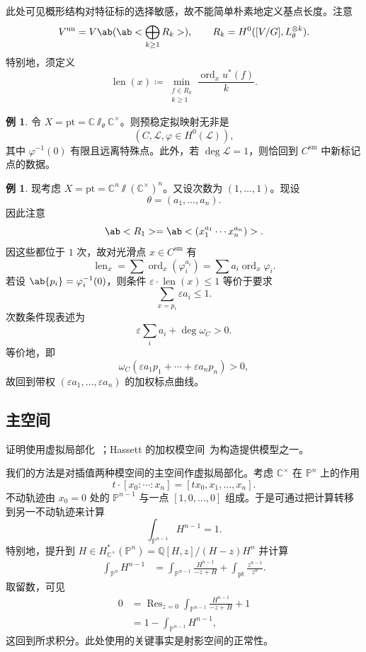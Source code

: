 \documentclass{amsart}
\theoremstyle{definition}
\newtheorem{exm}[thm]{例}
\theoremstyle{remark}
\theoremstyle{plain}
\theoremstyle{definition}
\theoremstyle{remark}
\newcommand{\C}{\mathbb{C}}
\newcommand{\Q}{\mathbb{Q}}
\renewcommand{\P}{\mathbb{P}}
\newcommand{\ep}{\varepsilon}
\newcommand{\mc}[1]{\mathcal{#1}}
\newcommand{\mr}[1]{\mathrm{#1}}
\newcommand{\on}[1]{\operatorname{#1}}
\newcommand{\1}{\mathbf{1}}
\newcommand{\2}{\mathbf{2}}
\newcommand{\3}{\mathbf{3}}
\begin{document}
此处可见概形结构对特征标的选择敏感，故不能简单朴素地定义基点长度。注意
\[ V^{\on{un}} = V\ab(\ab< \bigoplus_{k \geq 1} R_k>), \qquad R_k = H^0([V/G], L_{\theta}^{\otimes k}). \]
特别地，须定义
\[ \on{len}(x) \coloneqq \min_{\substack{f \in R_k \\ k \geq 1}} \frac{\on{ord}_x u^*(f)}{k}. \]

\begin{exm}
    令 \(X = \mr{pt} = \C \sslash_{\theta} \C^{\times}\)。则预稳定拟映射无非是
    \[ (C, \mc{L}, \varphi \in H^0(\mc{L})), \]
    其中 \(\varphi^{-1}(0)\) 有限且远离特殊点。此外，若 \(\deg \mc{L} = 1\)，则恰回到 \(C^{\mr{sm}}\) 中新标记点的数据。
\end{exm}

\begin{exm}
    现考虑 \(X = \mr{pt} = \C^n \sslash (\C^{\times})^n\)。又设次数为 \((1, \ldots, 1)\)。现设
    \[ \theta = (a_1, \ldots, a_n). \]
    因此注意
    \[ \ab<R_1> = \ab<(x_1^{a_1} \cdots x_n^{a_n})>. \]
    因这些都位于 \(1\) 次，故对光滑点 \(x \in C^{\mr{sm}}\) 有
    \[ \on{len}_x = \sum \on{ord}_x (\varphi_i^{a_i}) = \sum a_i \on{ord}_x \varphi_i. \]
    若设 \(\ab\{p_i\} = \varphi_i^{-1}(0)\)，则条件 \(\ep \cdot \on{len}(x) \leq 1\) 等价于要求
    \[ \sum_{x = p_i} \ep a_i \leq 1. \]
    次数条件现表述为
    \[ \ep \sum_i a_i + \deg \omega_C > 0. \]
    等价地，即
    \[ \omega_C(\ep a_1 p_1 + \cdots + \ep a_n p_n) > 0, \]
    故回到带权 \((\ep a_1, \ldots, \ep a_n)\) 的加权标点曲线。
\end{exm}

\subsection{主空间}%
\label{sub:Master space}

证明使用虚拟局部化~\cite{GP1999}；Hassett 的加权模空间~\cite{Hassett2003}为构造提供模型之一。

我们的方法是对插值两种模空间的主空间作虚拟局部化。考虑 \(\C^{\times}\) 在 \(\P^n\) 上的作用
\[ t \cdot [x_0 : \cdots : x_n] = [t x_0, x_1, \ldots, x_n]. \]
不动轨迹由 \(x_0 = 0\) 处的 \(\P^{n-1}\) 与一点 \([1, 0, \ldots, 0]\) 组成。于是可通过把计算转移到另一不动轨迹来计算
\[ \int_{\P^{n-1}} H^{n-1} = 1. \]
特别地，提升到 \(H \in H_{\C^{\times}}^* (\P^n) = \Q[H,z] / (H-z)H^n\) 并计算
\begin{align*}
    \int_{\P^n} H^{n-1} &= \int_{\P^{n-1}} \frac{H^{n-1}}{-z+H} + \int_{\mr{pt}} \frac{z^{n-1}}{z^n}.
\end{align*}
取留数，可见
\begin{align*}
    0 &= \on{Res}_{z = 0}\int_{\P^{n-1}} \frac{H^{n-1}}{-z+H} + 1 \\
    &= 1 - \int_{\P^{n-1}}H^{n-1},
\end{align*}
这回到所求积分。此处使用的关键事实是射影空间的正常性。
\end{document}
